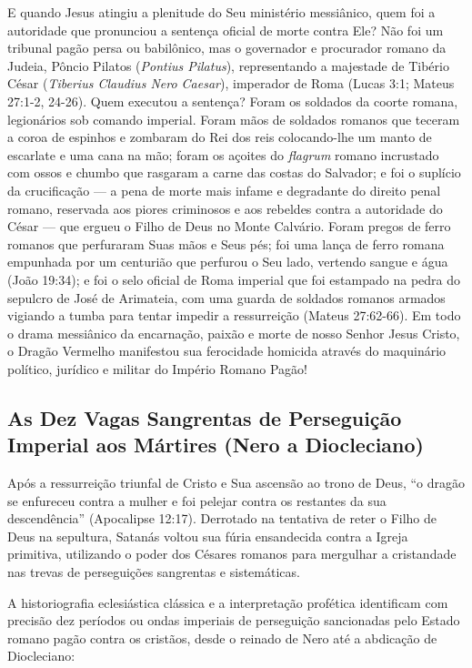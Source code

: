 E quando Jesus atingiu a plenitude do Seu ministério messiânico, quem foi a autoridade que pronunciou a sentença oficial de morte contra Ele?
Não foi um tribunal pagão persa ou babilônico, mas o governador e procurador romano da Judeia, Pôncio Pilatos (\textit{Pontius Pilatus}), representando a majestade de Tibério César (\textit{Tiberius Claudius Nero Caesar}), imperador de Roma (Lucas 3:1; Mateus 27:1-2, 24-26).
Quem executou a sentença? Foram os soldados da coorte romana, legionários sob comando imperial. Foram mãos de soldados romanos que teceram a coroa de espinhos e zombaram do Rei dos reis colocando-lhe um manto de escarlate e uma cana na mão; foram os açoites do \textit{flagrum} romano incrustado com ossos e chumbo que rasgaram a carne das costas do Salvador; e foi o suplício da crucificação — a pena de morte mais infame e degradante do direito penal romano, reservada aos piores criminosos e aos rebeldes contra a autoridade do César — que ergueu o Filho de Deus no Monte Calvário.
Foram pregos de ferro romanos que perfuraram Suas mãos e Seus pés; foi uma lança de ferro romana empunhada por um centurião que perfurou o Seu lado, vertendo sangue e água (João 19:34); e foi o selo oficial de Roma imperial que foi estampado na pedra do sepulcro de José de Arimateia, com uma guarda de soldados romanos armados vigiando a tumba para tentar impedir a ressurreição (Mateus 27:62-66). Em todo o drama messiânico da encarnação, paixão e morte de nosso Senhor Jesus Cristo, o Dragão Vermelho manifestou sua ferocidade homicida através do maquinário político, jurídico e militar do Império Romano Pagão!


\subsection{As Dez Vagas Sangrentas de Perseguição Imperial aos Mártires (Nero a Diocleciano)}


Após a ressurreição triunfal de Cristo e Sua ascensão ao trono de Deus, ``o dragão se enfureceu contra a mulher e foi pelejar contra os restantes da sua descendência'' (Apocalipse 12:17). Derrotado na tentativa de reter o Filho de Deus na sepultura, Satanás voltou sua fúria ensandecida contra a Igreja primitiva, utilizando o poder dos Césares romanos para mergulhar a cristandade nas trevas de perseguições sangrentas e sistemáticas.

A historiografia eclesiástica clássica e a interpretação profética identificam com precisão dez períodos ou ondas imperiais de perseguição sancionadas pelo Estado romano pagão contra os cristãos, desde o reinado de Nero até a abdicação de Diocleciano:


